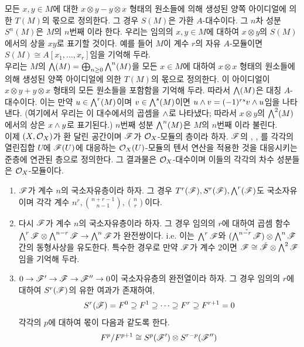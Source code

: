 \begin{enumerate}[label=\tb{5.\arabic*.},itemindent=0mm,itemsep=4mm]
	모든 $x,y\in M$에 대한 $x\otimes y-y\otimes x$ 형태의 원소들에 의해 생성된 양쪽 아이디얼에 의한 $T(M)$의 몫으로 정의한다.
	그 경우 $S(M)$은 가환 $A$-대수이다.
	그 $n$차 성분 $S^n(M)$은 $M$의 $n$번째 이라 한다.
	우리는 임의의 $x,y\in M$에 대하여 $x\otimes y$의 $S(M)$에서의 상을 $xy$로 표기할 것이다.
	예를 들어 $M$이 계수 $r$의 자유 $A$-모듈이면 $S(M)\cong A[x_1,\ldots,x_r]$임을 기억해 두라.\\
	우리는 $M$의  $\bigwedge(M)=\bigoplus_{n\ge 0}\bigwedge^n(M)$을
	모든 $x\in M$에 대하여 $x\otimes x$ 형태의 원소들에 의해 생성된 양쪽 아이디얼에 의한 $T(M)$의 몫으로 정의한다.
	이 아이디얼이 $x\otimes y+y\otimes x$ 형태의 모든 원소들을 포함함을 기억해 두라.
	따라서 $\bigwedge(M)$은  대칭 $A$-대수이다.
	이는 만약 $u\in\bigwedge^r(M)$이며 $v\in\bigwedge^s(M)$이면 $u\wedge v=(-1)^{rs}v\wedge u$임을 나타낸다.
	(여기에서 우리는 이 대수에서의 곱셈을 $\wedge$로 나타냈다; 따라서 $x\otimes y$의 $\bigwedge^2(M)$에서의 상은 $x\wedge y$로 표기된다.)
	$n$번째 성분 $\bigwedge^n(M)$은 $M$의 $n$번째 이라 불린다.\\
	이제 $(X,\mathcal{O}_X)$가 환 달린 공간이며 $\mathscr{F}$가 $\mathcal{O}_X$-모듈의 층이라 하자.
	$\mathscr{F}$의 , , 를
	각각의 열린집합 $U$에 $\mathscr{F}(U)$에 대응하는 $\mathcal{O}_X(U)$-모듈의 텐서 연산을 적용한 것을 대응시키는 준층에 연관된 층으로 정의한다.
	그 결과물은 $\mathcal{O}_X$-대수이며 이들의 각각의 차수 성분들은 $\mathcal{O}_X$-모듈이다.\\
	\begin{enumerate}[label=(\alph*)]
	\item $\mathscr{F}$가 계수 $n$의 국소자유층이라 하자. 그 경우 $T^r(\mathscr{F}),S^r(\mathscr{F}),\bigwedge^r(\mathscr{F})$도 국소자유이며
	각각 계수 $n^r,\binom{n+r-1}{n-1},\binom nr$이다.
	\item 다시 $\mathscr{F}$가 계수 $n$의 국소자유층이라 하자. 그 경우 임의의 $r$에 대하여
	곱셈 함수 $\bigwedge^r\mathscr{F}\otimes\bigwedge^{n-r}\mathscr{F}\rightarrow\bigwedge^n\mathscr{F}$가 완전쌍이다.
	i.e. 이는 $\bigwedge^r\mathscr{F}$와 $\check{(\bigwedge^{n-r}\mathscr{F})}\otimes\bigwedge^n\mathscr{F}$ 간의 동형사상을 유도한다.
	특수한 경우로 만약 $\mathscr{F}$가 계수 2이면 $\mathscr{F}\cong\check{\mathscr{F}}\otimes\bigwedge^2\mathscr{F}$임을 기억해 두라.
	\item $0\rightarrow\mathscr{F}'\rightarrow\mathscr{F}\rightarrow\mathscr{F}''\rightarrow 0$이 국소자유층의 완전열이라 하자.
	그 경우 임의의 $r$에 대하여 $S^r(\mathscr{F})$의 유한 여과가 존재하여,
	$$S^r(\mathscr{F})=F^0\supseteq F^1\supseteq\cdots\supseteq F^r\supseteq F^{r+1}=0$$
	각각의 $p$에 대하여 몫이 다음과 같도록 한다.
	$$F^p/F^{p+1}\cong S^p(\mathscr{F}')\otimes S^{r-p}(\mathscr{F}'')$$

\end{enumerate}
\end{enumerate}
